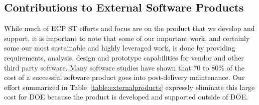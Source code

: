 \subsection{Contributions to External Software Products}\label{subsection:external-contributions}
While much of ECP ST efforts and focus are on the product that we develop and support, it is important to note that some of our important work, and certainly some our most sustainable and highly leveraged work, is done by providing requirements, analysis, design and prototype capabilities for vendor and other third party software.  Many software studies have shown that 70 to 80\% of the cost of a successful software product goes into post-delivery maintenance. Our effort summarized in Table~\ref{table:externalproducts} expressly eliminate this large cost for DOE because the product is developed and supported outside of DOE.


